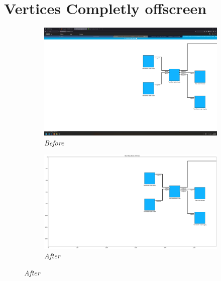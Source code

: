 \documentclass{article}
\begin{document}
\section{Vertices Completly offscreen}
\begin{figure}[H]
    \centering
    \begin{subfigure}[t]{0.9\textwidth}
        \centering
        \includegraphics[width=\textwidth]{testcases/vertices_offscreen_completely/140516-946679_input_image.png}
        \caption*{\textit{Before}}
    \end{subfigure}
    \newline
    \begin{subfigure}[t]{0.9\textwidth}
        \centering
        \includegraphics[width=\textwidth]{testcases/vertices_offscreen_completely/140536-824919_element_bbox_errors_labeled_colored.png}
        \caption*{\textit{After}}
    \end{subfigure}
    \label{fig:vertices_completly_offscreen}
\end{figure}
\newpage
\end{document}
